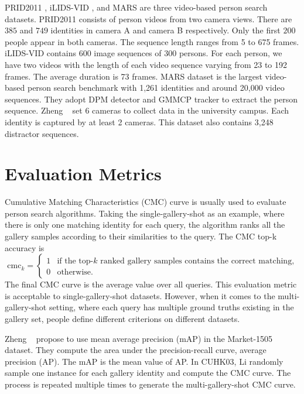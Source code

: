 PRID2011 \cite{hirzer2011person}, iLIDS-VID \cite{wang2014person}, and MARS \cite{zheng2016mars} are three video-based person search datasets. 
PRID2011 consists of person videos from two camera views. There are $385$ and $749$ identities in camera A and camera B respectively. Only the first $200$ people appear in both cameras. The sequence length ranges from 5 to 675 frames. 
iLIDS-VID contains 600 image sequences of 300 persons. For each person, we have two videos with the length of each video sequence varying from 23 to 192 frames. The average duration is 73 frames.
MARS dataset is the largest video-based person search benchmark with 1,261 identities and around 20,000 video sequences. They adopt DPM detector \cite{felzenszwalb2010object} and GMMCP tracker \cite{dehghan2015gmmcp} to extract the person sequence. Zheng \etal~\cite{zheng2016mars} set 6 cameras to collect data in the university campus. Each identity is captured by at least 2 cameras. This dataset also contains 3,248 distractor sequences. 

\section{Evaluation Metrics}
\label{ps:evaluation}
Cumulative Matching Characteristics (CMC) curve is usually used to evaluate person search algorithms. Taking the single-gallery-shot as an example, where there is only one matching identity for each query, the algorithm ranks all the gallery samples according to their similarities to the query. The CMC top-k accuracy is
\begin{equation}
  \mathrm{cmc}_k = \begin{cases}
    1 & \text{if the top-$k$ ranked gallery samples contains the correct matching,} \\
    0 & \text{otherwise}.
  \end{cases}
\end{equation}
The final CMC curve is the average value over all queries. This evaluation metric is acceptable to single-gallery-shot datasets. However, when it comes to the multi-gallery-shot setting, where each query has multiple ground truths existing in the gallery set, people define different criterions on different datasets.

Zheng \etal~\cite{zheng2015scalable} propose to use mean average precision (mAP) in the Market-1505 dataset. They compute the area under the precision-recall curve, \ie average precision (AP). The mAP is the mean value of AP.
In CUHK03, Li \etal randomly sample one instance for each gallery identity and compute the CMC curve. The process is repeated multiple times to generate the multi-gallery-shot CMC curve.